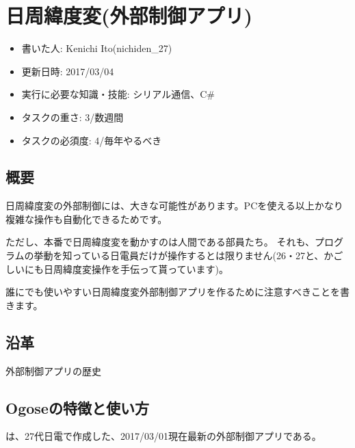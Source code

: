 \documentclass[letterpaper,10pt,dvipdfmx]{sphinxmanual}
\begin{document}
\chapter{日周緯度変(外部制御アプリ)}
\label{\detokenize{nissyu-idohen/pc-software::doc}}\label{\detokenize{nissyu-idohen/pc-software:id1}}\begin{itemize}
\item {} 
書いた人: Kenichi Ito(nichiden\_27)

\item {} 
更新日時: 2017/03/04

\item {} 
実行に必要な知識・技能: シリアル通信、C\#

\item {} 
タスクの重さ: 3/数週間

\item {} 
タスクの必須度: 4/毎年やるべき

\end{itemize}


\section{概要}
\label{\detokenize{nissyu-idohen/pc-software:id2}}
日周緯度変の外部制御には、大きな可能性があります。PCを使える以上かなり複雑な操作も自動化できるためです。

ただし、本番で日周緯度変を動かすのは人間である部員たち。
それも、プログラムの挙動を知っている日電員だけが操作するとは限りません(26・27と、かごしいにも日周緯度変操作を手伝って貰っています)。

誰にでも使いやすい日周緯度変外部制御アプリを作るために注意すべきことを書きます。


\section{沿革}
\label{\detokenize{nissyu-idohen/pc-software:id3}}
外部制御アプリの歴史


\section{Ogoseの特徴と使い方}
\label{\detokenize{nissyu-idohen/pc-software:ogose}}
は、27代日電で作成した、2017/03/01現在最新の外部制御アプリである。
\end{document}
